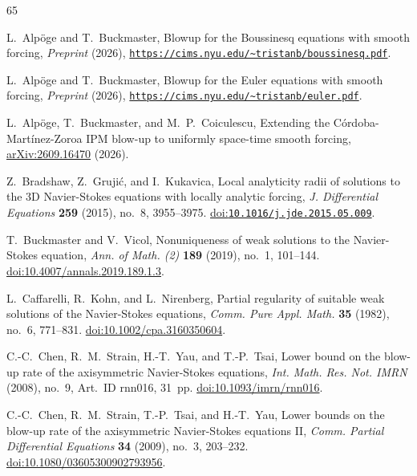 \documentclass[11pt,reqno]{amsproc}
\numberwithin{equation}{section}
\theoremstyle{remark}
\begin{document}
\begin{thebibliography}{65}

L.~Alp\"oge and T.~Buckmaster,
Blowup for the Boussinesq equations with smooth forcing,
\emph{Preprint} (2026),
\href{https://cims.nyu.edu/~tristanb/boussinesq.pdf}{\nolinkurl{https://cims.nyu.edu/~tristanb/boussinesq.pdf}}.

L.~Alp\"oge and T.~Buckmaster,
Blowup for the Euler equations with smooth forcing,
\emph{Preprint} (2026),
\href{https://cims.nyu.edu/~tristanb/euler.pdf}{\nolinkurl{https://cims.nyu.edu/~tristanb/euler.pdf}}.

L.~Alp\"oge, T.~Buckmaster, and M.~P.~Coiculescu,
Extending the C\'ordoba-Mart\'inez-Zoroa IPM blow-up to uniformly space-time smooth forcing,
\href{https://arxiv.org/abs/2609.16470}{arXiv:2609.16470} (2026).

Z.~Bradshaw, Z.~Gruji\'c, and I.~Kukavica,
Local analyticity radii of solutions to the 3D Navier-Stokes equations with locally analytic forcing,
\emph{J. Differential Equations} \textbf{259} (2015), no.~8, 3955--3975.
\href{https://doi.org/10.1016/j.jde.2015.05.009}{doi:\nolinkurl{10.1016/j.jde.2015.05.009}}.

T.~Buckmaster and V.~Vicol,
Nonuniqueness of weak solutions to the Navier-Stokes equation,
\emph{Ann. of Math. (2)} \textbf{189} (2019), no.~1, 101--144.
\href{https://doi.org/10.4007/annals.2019.189.1.3}{doi:10.4007/annals.2019.189.1.3}.

L.~Caffarelli, R.~Kohn, and L.~Nirenberg,
Partial regularity of suitable weak solutions of the Navier-Stokes equations,
\emph{Comm. Pure Appl. Math.} \textbf{35} (1982), no.~6, 771--831.
\href{https://doi.org/10.1002/cpa.3160350604}{doi:10.1002/cpa.3160350604}.

C.-C.~Chen, R.~M.~Strain, H.-T.~Yau, and T.-P.~Tsai,
Lower bound on the blow-up rate of the axisymmetric Navier-Stokes equations,
\emph{Int. Math. Res. Not. IMRN} (2008), no.~9, Art.~ID rnn016, 31~pp.
\href{https://doi.org/10.1093/imrn/rnn016}{doi:10.1093/imrn/rnn016}.

C.-C.~Chen, R.~M.~Strain, T.-P.~Tsai, and H.-T.~Yau,
Lower bounds on the blow-up rate of the axisymmetric Navier-Stokes equations II,
\emph{Comm. Partial Differential Equations} \textbf{34} (2009), no.~3, 203--232.
\href{https://doi.org/10.1080/03605300902793956}{doi:10.1080/03605300902793956}.


\end{thebibliography}
\end{document}
